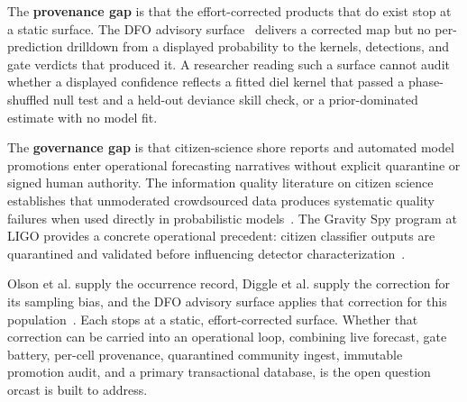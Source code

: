 The \textbf{provenance gap} is that the effort-corrected products that do exist stop at a static surface. The DFO advisory surface~\cite{thornton2022} delivers a corrected map but no per-prediction drilldown from a displayed probability to the kernels, detections, and gate verdicts that produced it. A researcher reading such a surface cannot audit whether a displayed confidence reflects a fitted diel kernel that passed a phase-shuffled null test and a held-out deviance skill check, or a prior-dominated estimate with no model fit.

The \textbf{governance gap} is that citizen-science shore reports and automated model promotions enter operational forecasting narratives without explicit quarantine or signed human authority. The information quality literature on citizen science establishes that unmoderated crowdsourced data produces systematic quality failures when used directly in probabilistic models~\cite{arxiv190508289}. The Gravity Spy program at LIGO provides a concrete operational precedent: citizen classifier outputs are quarantined and validated before influencing detector characterization~\cite{arxiv161104596}.

Olson et al. supply the occurrence record, Diggle et al. supply the correction for its sampling bias, and the DFO advisory surface applies that correction for this population~\cite{olson2018,diggle2010,thornton2022}. Each stops at a static, effort-corrected surface. Whether that correction can be carried into an operational loop, combining live forecast, gate battery, per-cell provenance, quarantined community ingest, immutable promotion audit, and a primary transactional database, is the open question orcast is built to address.
